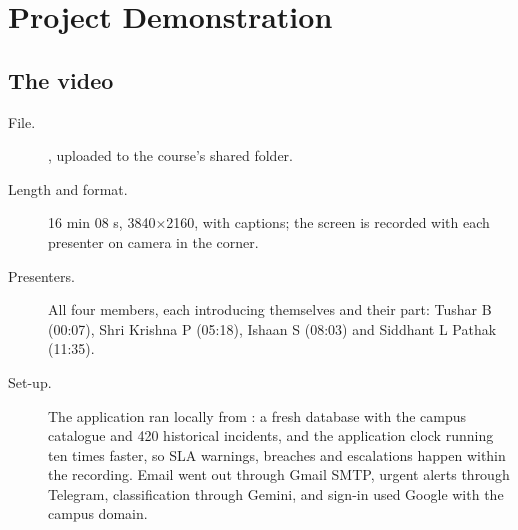 \chapter{Project Demonstration}\label{ch:demo}

\section{The video}
\begin{description}
  \item[File.] , uploaded to the course's shared folder.
  \item[Length and format.] 16 min 08 s, 3840$\times$2160, with captions; the screen is recorded
    with each presenter on camera in the corner.
  \item[Presenters.] All four members, each introducing themselves and their part: Tushar B
    (00:07), Shri Krishna P (05:18), Ishaan S (08:03) and Siddhant L Pathak (11:35).
  \item[Set-up.] The application ran locally from : a fresh database with
    the campus catalogue and 420 historical incidents, and the application clock running ten
    times faster, so SLA warnings, breaches and escalations happen within the recording. Email
    went out through Gmail SMTP, urgent alerts through Telegram, classification through Gemini,
    and sign-in used Google with the campus domain.
\end{description}


